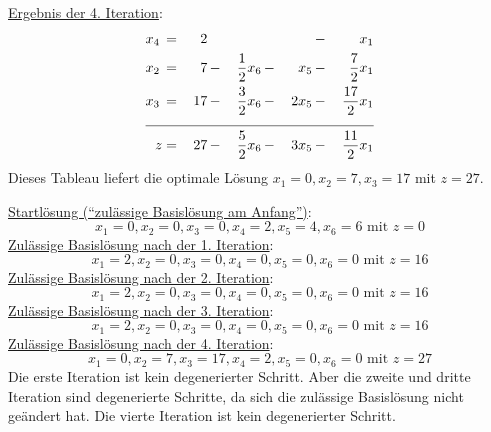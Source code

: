 \documentclass[10pt,a4paper,oneside,ngerman,numbers=noenddot]{scrartcl}
\begin{document}
		\underline{Ergebnis der 4. Iteration}:
		\begin{alignat*}{5}
			x_{4} \,&=&\, 2 \,&& && &-&\, x_{1} \\
			x_{2} \,&=&\, 7 \,&-&\, \frac{1}{2}x_{6} \,&-&\, x_{5} \,&-&\, \frac{7}{2}x_{1} \\
			x_{3} \,&=&\, 17 \,&-&\, \frac{3}{2}x_{6} \,&-&\, 2x_{5} \,&-&\, \frac{17}{2}x_{1} \\ \cline{1 - 9}
			z &=& 27 \,&-&\, \frac{5}{2}x_{6} \,&-&\, 3x_{5} \,&-&\, \frac{11}{2}x_{1}
		\end{alignat*}
		Dieses Tableau liefert die optimale Lösung $x_{1} = 0, x_{2} = 7, x_{3} = 17$ mit $z = 27$.
		
		\underline{Startlösung ("`zulässige Basislösung am Anfang"')}:
		\[
			x_{1} = 0, x_{2} = 0, x_{3} = 0, x_{4} = 2, x_{5} = 4, x_{6} = 6  \text{ mit } z = 0
		\]
		\underline{Zulässige Basislösung nach der 1. Iteration}:
		\[
			x_{1} = 2, x_{2} = 0, x_{3} = 0, x_{4} = 0, x_{5} = 0, x_{6} = 0 \text{ mit } z = 16
		\]
		\underline{Zulässige Basislösung nach der 2. Iteration}:
		\[
			x_{1} = 2, x_{2} = 0, x_{3} = 0, x_{4} = 0, x_{5} = 0, x_{6} = 0 \text{ mit } z = 16
		\]
		\underline{Zulässige Basislösung nach der 3. Iteration}:
		\[
			x_{1} = 2, x_{2} = 0, x_{3} = 0, x_{4} = 0, x_{5} = 0, x_{6} = 0 \text{ mit } z = 16
		\]
		\underline{Zulässige Basislösung nach der 4. Iteration}:
		\[
			x_{1} = 0, x_{2} = 7, x_{3} = 17, x_{4} = 2, x_{5} = 0, x_{6} = 0 \text{ mit } z = 27
		\]
		Die erste Iteration ist kein degenerierter Schritt. Aber die zweite und dritte Iteration sind degenerierte Schritte, da sich die zulässige Basislösung nicht geändert hat. Die vierte Iteration ist kein degenerierter Schritt.
\end{document}
